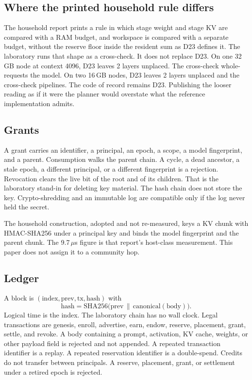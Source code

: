 \documentclass[11pt]{article}
\begin{document}
\subsection{Where the printed household rule differs}
\label{sec:disagree}
The household report prints a rule in which stage weight and stage KV are compared with a RAM budget, and workspace is compared with a separate budget, without the reserve floor inside the resident sum as D23 defines it. The laboratory runs that shape as a cross-check. It does not replace D23. On one 32\,GB node at context 4096, D23 leaves 2 layers unplaced. The cross-check whole-requests the model. On two 16\,GB nodes, D23 leaves 2 layers unplaced and the cross-check pipelines. The code of record remains D23. Publishing the looser reading as if it were the planner would overstate what the reference implementation admits.

\subsection{Grants}
A grant carries an identifier, a principal, an epoch, a scope, a model fingerprint, and a parent. Consumption walks the parent chain. A cycle, a dead ancestor, a stale epoch, a different principal, or a different fingerprint is a rejection. Revocation clears the live bit of the root and of its children. That is the laboratory stand-in for deleting key material. The hash chain does not store the key. Crypto-shredding and an immutable log are compatible only if the log never held the secret.

The household construction, adopted and not re-measured, keys a KV chunk with HMAC-SHA256 under a principal key and binds the model fingerprint and the parent chunk. The 9.7\,\(\mu\)s figure is that report's host-class measurement. This paper does not assign it to a community hop.

\subsection{Ledger}
\label{sec:ledger}
A block is \((\mathrm{index},\mathrm{prev},\mathrm{tx},\mathrm{hash})\) with
\begin{equation}
\mathrm{hash}=\mathrm{SHA256}\big(\mathrm{prev}\,\|\,\mathrm{canonical}(\mathrm{body})\big).
\end{equation}
Logical time is the index. The laboratory chain has no wall clock. Legal transactions are genesis, enroll, advertise, earn, endow, reserve, placement, grant, settle, and revoke. A body containing a prompt, activation, KV cache, weights, or other payload field is rejected and not appended. A repeated transaction identifier is a replay. A repeated reservation identifier is a double-spend. Credits do not transfer between principals. A reserve, placement, grant, or settlement under a retired epoch is rejected.
\end{document}
